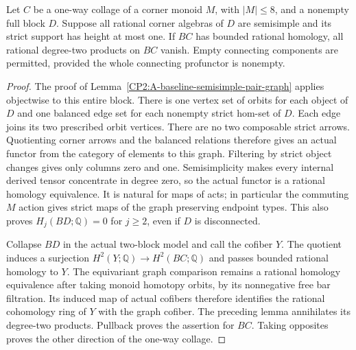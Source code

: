 \begin{proposition}
\label{CP2:A-semisimple-height-one-block-eight}
Let $C$ be a one-way collage of a corner monoid $M$, with $|M|\leq8$,
and a nonempty full block $D$.  Suppose all rational corner algebras
of $D$ are semisimple and its strict support has height at most one.
If $BC$ has bounded rational homology, all rational degree-two products
on $BC$ vanish.  Empty connecting components are permitted, provided
the whole connecting profunctor is nonempty.
\end{proposition}
\begin{proof}
The proof of Lemma~\ref{CP2:A-baseline-semisimple-pair-graph} applies
objectwise to this entire block.  There is one vertex set of orbits
for each object of $D$ and one balanced edge set for each nonempty
strict hom-set of $D$.  Each edge joins its two prescribed orbit
vertices.  There are no two composable strict arrows.  Quotienting
corner arrows and the balanced relations therefore gives an actual
functor from the category of elements to this graph.  Filtering by
strict object changes gives only columns zero and one.  Semisimplicity
makes every internal derived tensor concentrate in degree zero, so
the actual functor is a rational homology equivalence.  It is natural
for maps of acts; in particular the commuting $M$ action gives strict
maps of the graph preserving endpoint types.  This also proves
$H_j(BD;\mathbb Q)=0$ for $j\geq2$, even if $D$ is disconnected.

Collapse $BD$ in the actual two-block model and call the cofiber $Y$.
The quotient induces a surjection $H^2(Y;\mathbb Q)\to H^2(BC;\mathbb Q)$
and passes bounded rational homology to $Y$.  The equivariant graph
comparison remains a rational homology equivalence after taking monoid
homotopy orbits, by its nonnegative free bar filtration.  Its induced
map of actual cofibers therefore identifies the rational cohomology
ring of $Y$ with the graph cofiber.  The preceding lemma annihilates
its degree-two products.  Pullback proves the assertion for $BC$.
Taking opposites proves the other direction of the one-way collage.
\end{proof}

